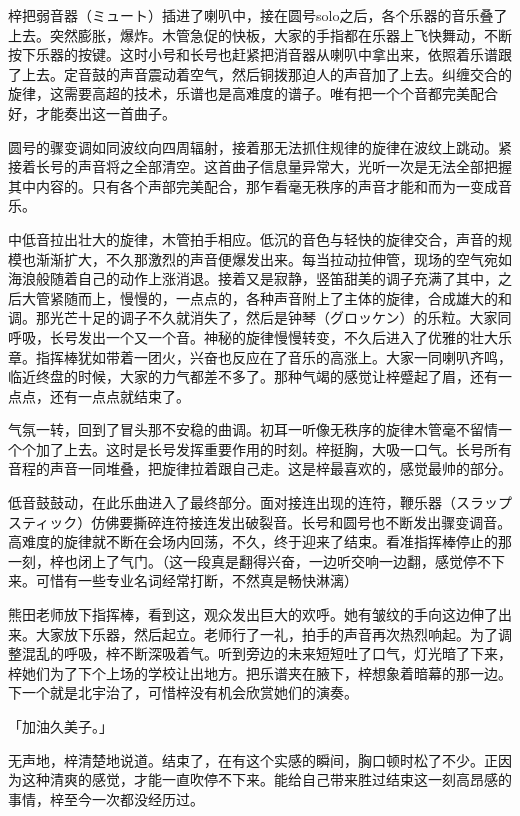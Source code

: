 \documentclass[UTF8]{ctexart}
\begin{document}
    梓把弱音器（ミュート）插进了喇叭中，接在圆号solo之后，各个乐器的音乐叠了上去。突然膨胀，爆炸。木管急促的快板，大家的手指都在乐器上飞快舞动，不断按下乐器的按键。这时小号和长号也赶紧把消音器从喇叭中拿出来，依照着乐谱跟了上去。定音鼓的声音震动着空气，然后铜拨那迫人的声音加了上去。纠缠交合的旋律，这需要高超的技术，乐谱也是高难度的谱子。唯有把一个个音都完美配合好，才能奏出这一首曲子。

    圆号的骤变调如同波纹向四周辐射，接着那无法抓住规律的旋律在波纹上跳动。紧接着长号的声音将之全部清空。这首曲子信息量异常大，光听一次是无法全部把握其中内容的。只有各个声部完美配合，那乍看毫无秩序的声音才能和而为一变成音乐。

    中低音拉出壮大的旋律，木管拍手相应。低沉的音色与轻快的旋律交合，声音的规模也渐渐扩大，不久那激烈的声音便爆发出来。每当拉动拉伸管，现场的空气宛如海浪般随着自己的动作上涨消退。接着又是寂静，竖笛甜美的调子充满了其中，之后大管紧随而上，慢慢的，一点点的，各种声音附上了主体的旋律，合成雄大的和调。那光芒十足的调子不久就消失了，然后是钟琴（グロッケン）的乐粒。大家同呼吸，长号发出一个又一个音。神秘的旋律慢慢转变，不久后进入了优雅的壮大乐章。指挥棒犹如带着一团火，兴奋也反应在了音乐的高涨上。大家一同喇叭齐鸣，临近终盘的时候，大家的力气都差不多了。那种气竭的感觉让梓蹙起了眉，还有一点点，还有一点点就结束了。

    气氛一转，回到了冒头那不安稳的曲调。初耳一听像无秩序的旋律木管毫不留情一个个加了上去。这时是长号发挥重要作用的时刻。梓挺胸，大吸一口气。长号所有音程的声音一同堆叠，把旋律拉着跟自己走。这是梓最喜欢的，感觉最帅的部分。

    低音鼓鼓动，在此乐曲进入了最终部分。面对接连出现的连符，鞭乐器（スラップスティック）仿佛要撕碎连符接连发出破裂音。长号和圆号也不断发出骤变调音。高难度的旋律就不断在会场内回荡，不久，终于迎来了结束。看准指挥棒停止的那一刻，梓也闭上了气门。（这一段真是翻得兴奋，一边听交响一边翻，感觉停不下来。可惜有一些专业名词经常打断，不然真是畅快淋漓）

    熊田老师放下指挥棒，看到这，观众发出巨大的欢呼。她有皱纹的手向这边伸了出来。大家放下乐器，然后起立。老师行了一礼，拍手的声音再次热烈响起。为了调整混乱的呼吸，梓不断深吸着气。听到旁边的未来短短吐了口气，灯光暗了下来，梓她们为了下个上场的学校让出地方。把乐谱夹在腋下，梓想象着暗幕的那一边。下一个就是北宇治了，可惜梓没有机会欣赏她们的演奏。

    「加油久美子。」

    无声地，梓清楚地说道。结束了，在有这个实感的瞬间，胸口顿时松了不少。正因为这种清爽的感觉，才能一直吹停不下来。能给自己带来胜过结束这一刻高昂感的事情，梓至今一次都没经历过。
\end{document}
